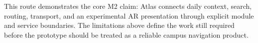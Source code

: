 \documentclass[11pt]{article}
\begin{document}
This route demonstrates the core M2 claim: Atlas connects daily context, search, routing, transport, and an experimental AR presentation through explicit module and service boundaries. The limitations above define the work still required before the prototype should be treated as a reliable campus navigation product.
\end{document}
